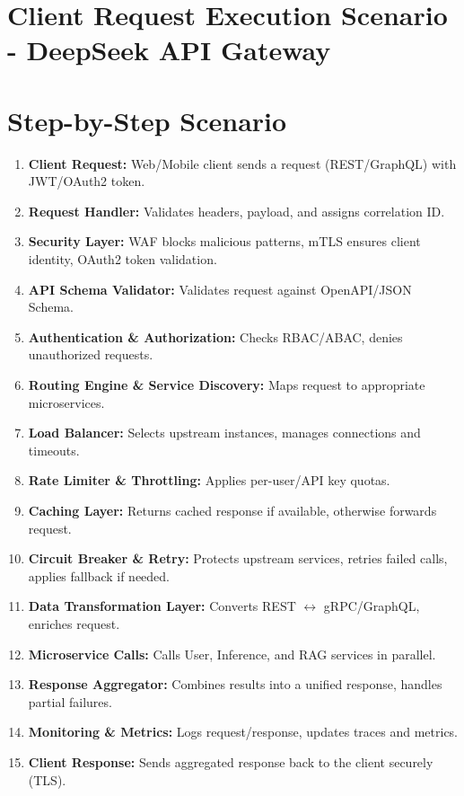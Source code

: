\documentclass[a4paper,11pt]{article}
\begin{document}
\section{\textbf{Client Request Execution Scenario - DeepSeek API Gateway}} 

\vspace{0.5cm}

\section*{Step-by-Step Scenario}

\begin{enumerate}
    \item \textbf{Client Request:} Web/Mobile client sends a request (REST/GraphQL) with JWT/OAuth2 token.
    \item \textbf{Request Handler:} Validates headers, payload, and assigns correlation ID.
    \item \textbf{Security Layer:} WAF blocks malicious patterns, mTLS ensures client identity, OAuth2 token validation.
    \item \textbf{API Schema Validator:} Validates request against OpenAPI/JSON Schema.
    \item \textbf{Authentication \& Authorization:} Checks RBAC/ABAC, denies unauthorized requests.
    \item \textbf{Routing Engine \& Service Discovery:} Maps request to appropriate microservices.
    \item \textbf{Load Balancer:} Selects upstream instances, manages connections and timeouts.
    \item \textbf{Rate Limiter \& Throttling:} Applies per-user/API key quotas.
    \item \textbf{Caching Layer:} Returns cached response if available, otherwise forwards request.
    \item \textbf{Circuit Breaker \& Retry:} Protects upstream services, retries failed calls, applies fallback if needed.
    \item \textbf{Data Transformation Layer:} Converts REST $\leftrightarrow$ gRPC/GraphQL, enriches request.
    \item \textbf{Microservice Calls:} Calls User, Inference, and RAG services in parallel.
    \item \textbf{Response Aggregator:} Combines results into a unified response, handles partial failures.
    \item \textbf{Monitoring \& Metrics:} Logs request/response, updates traces and metrics.
    \item \textbf{Client Response:} Sends aggregated response back to the client securely (TLS).
\end{enumerate}

\vspace{0.5cm}
\end{document}
